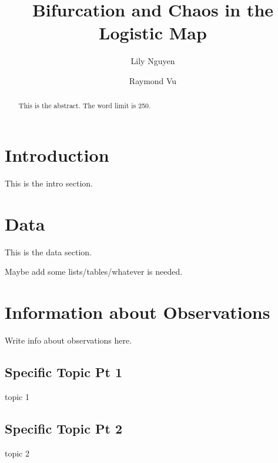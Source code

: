 \documentclass{aastex631}
\begin{document}
\title{Bifurcation and Chaos in the Logistic Map}
\author{Lily Nguyen}

\author{Raymond Vu}



\begin{abstract}
This is the abstract. The word limit is 250.


\end{abstract}

\section{Introduction} \label{sec:intro}
This is the intro section.

\section{Data} \label{sec:data}
This is the data section.

Maybe add some lists/tables/whatever is needed.



\section{Information about Observations}
Write info about observations here.

\subsection{Specific Topic Pt 1} \label{sec:subtopic1}
topic 1

\subsection{Specific Topic Pt 2} \label{sec:subtopic2}
topic 2
\end{document}
